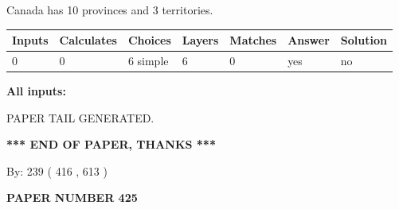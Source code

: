 \documentclass[12pt]{article}
\begin{document}
 
\noindent{}
 
 
Canada has 10  provinces and 3 territories.
 
 
\noindent{}
 
 
   
   
   
   
\noindent\begin{tabular}{|l|l|l|l|l|l|l|}
 \hline
Inputs & Calculates & Choices & Layers & Matches & Answer & Solution \\ \hline
 0  & 
 0  & 
 6
  simple  
  & 
 6  & 
 0  & 
  yes & 
  no 
  \\ \hline
 \end{tabular}
   
   
   
   
\noindent{}
   
   
   
   
\noindent\vspace{0.1in}\hspace{-0.08in} {\textbf{\Large{All inputs: }}}
   
   
   
   
   
   
 \vspace{0.2in}
 
   
   
\vspace{2.0in} PAPER TAIL GENERATED.
   
   
   
   
\vspace{1.0in} 
{\textbf{\large{ *** END OF PAPER, THANKS *** }}} 
   
   
\hspace{1.0in} By: 
 239 ( 416 ,  613 )
   
   
   
   
\newpage 
\setcounter{page}{ 
   425001 } 
   
   
   
   
 {\textbf{ \Large{ PAPER NUMBER  425  }}}
   
   
\vspace{0.2in}
   
   
   
\end{document}
